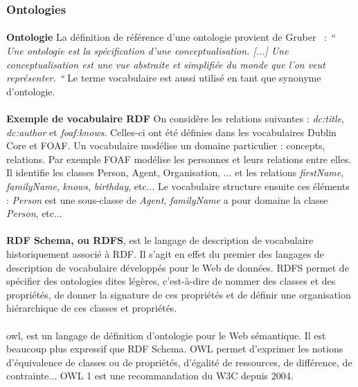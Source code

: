 \documentclass[12pt,a4]{report}
\begin{document}
\subsubsection{Ontologies}
\paragraph{}
\textbf{Ontologie} La définition de référence d’une ontologie provient de Gruber~\cite{gruber1995}  :  {\it `` Une ontologie est la spécification d’une conceptualisation. [...] Une conceptualisation est une vue abstraite et simplifiée du monde que l’on veut représenter. ``} Le terme vocabulaire est aussi utilisé en tant que synonyme d’ontologie.
\paragraph{}
\textbf{Exemple de vocabulaire RDF} On considère les relations suivantes : \textit{dc:title}, \textit{dc:author} et \textit{foaf:knows}. Celles-ci ont été définies dans les vocabulaires Dublin Core et FOAF. Un vocabulaire modélise un domaine particulier : concepts, relations. Par exemple FOAF modélise les personnes et leurs relations entre elles. Il identifie les classes Person, Agent, Organisation, ... et les relations \textit{firstName}, \textit{familyName}, \textit{knows}, \textit{birthday}, etc... Le vocabulaire structure ensuite ces  éléments : \textit{Person} est une sous-classe de \textit{Agent}, \textit{familyName} a pour domaine la classe \textit{Person}, etc...
\paragraph{}
\textbf{RDF Schema, ou RDFS}, est le langage de description de vocabulaire historiquement associé à RDF. Il s'agit en effet du premier des langages de description de vocabulaire développés pour le Web de données. RDFS permet de spécifier des ontologies dites légères, c'est-à-dire de nommer des classes et des propriétés, de donner la signature de ces propriétés et de définir une organisation hiérarchique de ces classes et propriétés.
\paragraph{}
\gls{owl}, est un langage de définition d'ontologie pour le Web sémantique. Il est beaucoup plus expressif que RDF Schema. OWL permet d'exprimer les notions d'équivalence de classes ou de propriétés, d'égalité de ressources, de différence, de contrainte... OWL 1 est une recommandation du W3C depuis 2004.
\newpage
\end{document}
